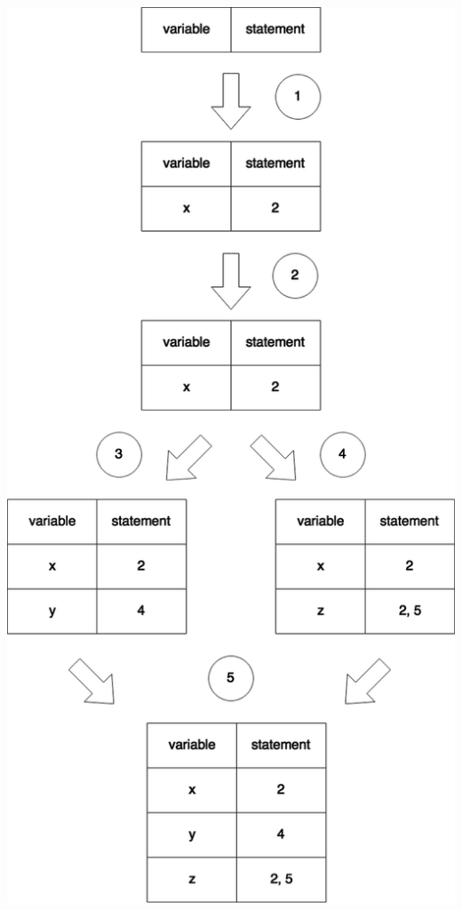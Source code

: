 \documentclass[12pt]{article}
\begin{document}
{{{{{{{{{{{{{{\begin{center}
\begin{minipage}{14em}
\end{minipage}
\end{center}
\begin{center}
\noindent
\begin{minipage}{15em}
\begin{flushleft}
\noindent
\includegraphics[width=1.15\textwidth]{affects1.png}

\end{flushleft}
\end{minipage}
\end{center}}}}}}}}}}}}}}}
\end{document}
